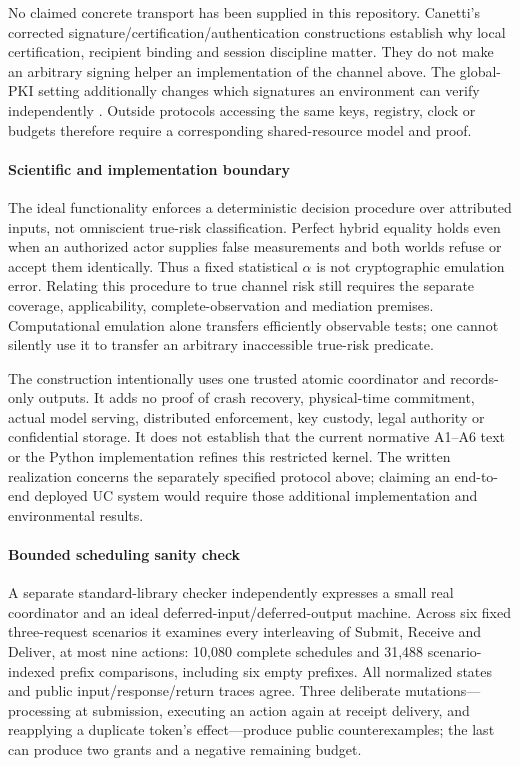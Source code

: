 No claimed concrete transport has been supplied in this repository.
Canetti's corrected signature/certification/authentication constructions
\citep{canetti2004authentication} establish why local certification,
recipient binding and session discipline matter. They do not make an
arbitrary signing helper an implementation of the channel above.
The global-PKI setting additionally changes which signatures an
environment can verify independently \citep{canetti2016globalpki}.
Outside protocols accessing the same keys, registry, clock or budgets
therefore require a corresponding shared-resource model and proof.

\paragraph{Scientific and implementation boundary}
The ideal functionality enforces a deterministic decision procedure over
attributed inputs, not omniscient true-risk classification. Perfect
hybrid equality holds even when an authorized actor supplies false
measurements and both worlds refuse or accept them identically.
Thus a fixed statistical $\alpha$ is not cryptographic emulation error.
Relating this procedure to true channel risk still requires the separate
coverage, applicability, complete-observation and mediation premises.
Computational emulation alone transfers efficiently observable tests;
one cannot silently use it to transfer an arbitrary inaccessible
true-risk predicate.

The construction intentionally uses one trusted atomic coordinator and
records-only outputs. It adds no proof of crash recovery, physical-time
commitment, actual model serving, distributed enforcement, key custody,
legal authority or confidential storage. It does not establish that the
current normative A1--A6 text or the Python implementation refines this
restricted kernel. The written realization concerns the separately
specified protocol above; claiming an end-to-end deployed UC system would
require those additional implementation and environmental results.

\paragraph{Bounded scheduling sanity check}
A separate standard-library checker independently expresses a small real
coordinator and an ideal deferred-input/deferred-output machine.
Across six fixed three-request scenarios it examines every interleaving
of Submit, Receive and Deliver, at most nine actions:
10,080 complete schedules and 31,488 scenario-indexed prefix comparisons,
including six empty prefixes. All normalized states and public
input/response/return traces agree. Three deliberate mutations---processing
at submission, executing an action again at receipt delivery, and reapplying
a duplicate token's effect---produce public counterexamples; the last can
produce two grants and a negative remaining budget.


